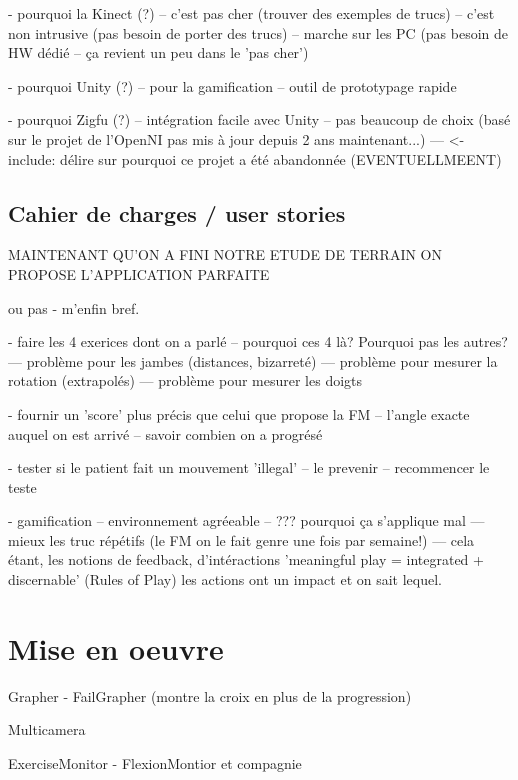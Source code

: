 \documentclass[french,12pt]{report}
\begin{document}
		
		- pourquoi la Kinect (?)
		-- c'est pas cher (trouver des exemples de trucs)
		-- c'est non intrusive (pas besoin de porter des trucs)
		-- marche sur les PC (pas besoin de HW dédié -- ça revient un peu dans le 'pas cher')
		
		- pourquoi Unity (?)
		-- pour la gamification
		-- outil de prototypage rapide
		
		- pourquoi Zigfu (?)
		-- intégration facile avec Unity
		-- pas beaucoup de choix (basé sur le projet de l'OpenNI pas mis à jour depuis 2 ans maintenant...)
		--- <- include: délire sur pourquoi ce projet a été abandonnée (EVENTUELLMEENT)
		
		
		\subsection{Cahier de charges / user stories} 		%
		
		MAINTENANT QU'ON A FINI NOTRE ETUDE DE TERRAIN ON PROPOSE L'APPLICATION PARFAITE 
		
		ou pas - m'enfin bref.
		
		- faire les 4 exerices dont on a parlé
		-- pourquoi ces 4 là? Pourquoi pas les autres?
		--- problème pour les jambes (distances, bizarreté)
		--- problème pour mesurer la rotation (extrapolés)
		--- problème pour mesurer les doigts 
		
		- fournir un 'score' plus précis que celui que propose la FM
		-- l'angle exacte auquel on est arrivé
		-- savoir combien on a progrésé
		
		- tester si le patient fait un mouvement 'illegal'
		-- le prevenir
		-- recommencer le teste
		
		
		- gamification
		-- environnement agréeable
		-- ??? pourquoi ça s'applique mal
		--- mieux les truc répétifs (le FM on le fait genre une fois par semaine!)
		--- cela étant, les notions de feedback, d'intéractions 
			'meaningful play = integrated + discernable' (Rules of Play) les actions ont un 
			impact et on sait lequel. 
		
		\section{Mise en oeuvre} 	%

		Grapher
		- FailGrapher (montre la croix en plus de la progression)
		
		Multicamera
		
		ExerciseMonitor
		- FlexionMontior et compagnie
		
\end{document}

